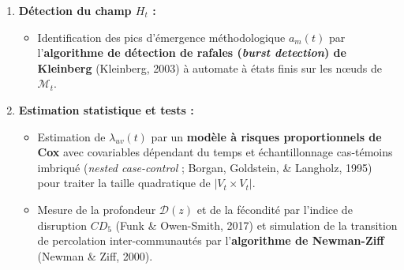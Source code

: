 \documentclass[a4paper,11pt]{article}
\providecommand{\tightlist}{\setlength{\itemsep}{0pt}\setlength{\parskip}{0pt}}
\begin{document}
\begin{enumerate}
  \begin{itemize}
  \tightlist
  \item
    \(d_S(u,v;t)\) est calculée par l'algorithme de \textbf{Fused
    Gromov-Wasserstein} (Vayer, Chapel, Flamary, Tavenard, \& Courty,
    2019) implémenté dans la bibliothèque \texttt{POT} (\emph{Python
    Optimal Transport}), avec régularisation entropique de Sinkhorn pour
    passer à l'échelle.
  \item
    \(\Phi(u,v;t)\) (recherche de l'injection partielle maximale
    \(\phi^*\) avec pénalité de conflit \(\chi\)) est résolu exactement
    sur les voisinages de rayon \(k \le 3\) par l'algorithme
    \textbf{VF2++} (Jüttner \& Madarasi, 2018) étendu au \emph{Maximum
    Common Edge Subgraph} (MCES), ou encodé comme programme logique en
    \textbf{Answer Set Programming (solveur Clingo)} où les
    incompatibilités \(\mathcal{I}\) sont déclarées comme contraintes
    d'intégrité souples (\emph{weak constraints}).
  \end{itemize}
\item
  \textbf{Détection du champ \(H_t\) :}

  \begin{itemize}
  \tightlist
  \item
    Identification des pics d'émergence méthodologique \(a_m(t)\) par
    l'\textbf{algorithme de détection de rafales (\emph{burst
    detection}) de Kleinberg} (Kleinberg, 2003) à automate à états finis
    sur les nœuds de \(\mathcal{M}_t\).
  \end{itemize}
\item
  \textbf{Estimation statistique et tests :}

  \begin{itemize}
  \tightlist
  \item
    Estimation de \(\lambda_{uv}(t)\) par un \textbf{modèle à risques
    proportionnels de Cox} avec covariables dépendant du temps et
    échantillonnage cas-témoins imbriqué (\emph{nested case-control} ;
    Borgan, Goldstein, \& Langholz, 1995) pour traiter la taille
    quadratique de \(|V_t \times V_t|\).
  \item
    Mesure de la profondeur \(\mathcal{D}(z)\) et de la fécondité par
    l'indice de disruption \textbf{\(CD_5\)} (Funk \& Owen-Smith, 2017)
    et simulation de la transition de percolation inter-communautés par
    l'\textbf{algorithme de Newman-Ziff} (Newman \& Ziff, 2000).
  \end{itemize}
\end{enumerate}
\end{document}
